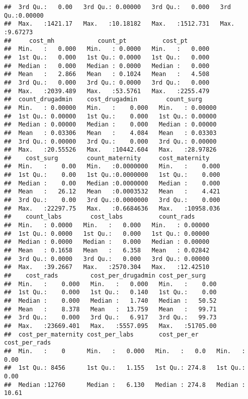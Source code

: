 \documentclass[]{article}
\begin{document}
\begin{verbatim}
##  3rd Qu.:   0.00   3rd Qu.: 0.00000   3rd Qu.:   0.000   3rd Qu.:0.00000  
##  Max.   :1421.17   Max.   :10.18182   Max.   :1512.731   Max.   :9.67273  
##     cost_mh            count_pt          cost_pt        
##  Min.   :   0.000   Min.   : 0.0000   Min.   :   0.000  
##  1st Qu.:   0.000   1st Qu.: 0.0000   1st Qu.:   0.000  
##  Median :   0.000   Median : 0.0000   Median :   0.000  
##  Mean   :   2.866   Mean   : 0.1024   Mean   :   4.508  
##  3rd Qu.:   0.000   3rd Qu.: 0.0000   3rd Qu.:   0.000  
##  Max.   :2039.489   Max.   :53.5761   Max.   :2255.479  
##  count_drugadmin    cost_drugadmin        count_surg      
##  Min.   : 0.00000   Min.   :    0.000   Min.   : 0.00000  
##  1st Qu.: 0.00000   1st Qu.:    0.000   1st Qu.: 0.00000  
##  Median : 0.00000   Median :    0.000   Median : 0.00000  
##  Mean   : 0.03306   Mean   :    4.084   Mean   : 0.03303  
##  3rd Qu.: 0.00000   3rd Qu.:    0.000   3rd Qu.: 0.00000  
##  Max.   :20.55526   Max.   :10442.604   Max.   :28.97826  
##    cost_surg        count_maternity     cost_maternity     
##  Min.   :    0.00   Min.   :0.0000000   Min.   :    0.000  
##  1st Qu.:    0.00   1st Qu.:0.0000000   1st Qu.:    0.000  
##  Median :    0.00   Median :0.0000000   Median :    0.000  
##  Mean   :   26.12   Mean   :0.0003532   Mean   :    4.421  
##  3rd Qu.:    0.00   3rd Qu.:0.0000000   3rd Qu.:    0.000  
##  Max.   :22297.75   Max.   :0.6684636   Max.   :10958.036  
##    count_labs        cost_labs          count_rads      
##  Min.   : 0.0000   Min.   :   0.000   Min.   : 0.00000  
##  1st Qu.: 0.0000   1st Qu.:   0.000   1st Qu.: 0.00000  
##  Median : 0.0000   Median :   0.000   Median : 0.00000  
##  Mean   : 0.1658   Mean   :   6.358   Mean   : 0.02842  
##  3rd Qu.: 0.0000   3rd Qu.:   0.000   3rd Qu.: 0.00000  
##  Max.   :39.2667   Max.   :2570.304   Max.   :12.42510  
##    cost_rads         cost_per_drugadmin cost_per_surg     
##  Min.   :    0.000   Min.   :   0.000   Min.   :    0.00  
##  1st Qu.:    0.000   1st Qu.:   0.140   1st Qu.:    0.00  
##  Median :    0.000   Median :   1.740   Median :   50.52  
##  Mean   :    8.378   Mean   :  13.759   Mean   :   99.71  
##  3rd Qu.:    0.000   3rd Qu.:   6.917   3rd Qu.:   99.73  
##  Max.   :23669.401   Max.   :5557.095   Max.   :51705.00  
##  cost_per_maternity cost_per_labs       cost_per_er     cost_per_rads    
##  Min.   :    0      Min.   :   0.000   Min.   :   0.0   Min.   :   0.00  
##  1st Qu.: 8456      1st Qu.:   1.155   1st Qu.: 274.8   1st Qu.:   0.00  
##  Median :12760      Median :   6.130   Median : 274.8   Median :  10.61  

\end{verbatim}
\end{document}
